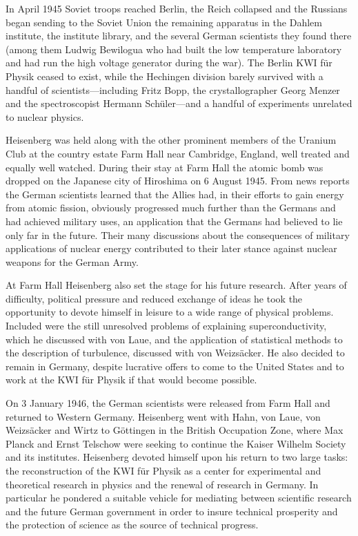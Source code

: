 \documentclass{article}
\begin{document}
In April 1945 Soviet troops reached Berlin, the Reich collapsed and the Russians began sending to the Soviet Union the remaining apparatus in the Dahlem institute, the institute library, and the several German scientists they found there (among them Ludwig Bewilogua who had built the low temperature laboratory and had run the high voltage generator during the war). The Berlin KWI für Physik ceased to exist, while the Hechingen division barely survived with a handful of scientists---including Fritz Bopp, the crystallographer Georg Menzer and the spectroscopist Hermann Schüler---and a handful of experiments unrelated to nuclear physics.

Heisenberg was held along with the other prominent members of the Uranium Club at the country estate Farm Hall near Cambridge, England, well treated and equally well watched. During their stay at Farm Hall the atomic bomb was dropped on the Japanese city of Hiroshima on 6 August 1945. From news reports the German scientists learned that the Allies had, in their efforts to gain energy from atomic fission, obviously progressed much further than the Germans and had achieved military uses, an application that the Germans had believed to lie only far in the future. Their many discussions about the consequences of military applications of nuclear energy contributed to their later stance against nuclear weapons for the German Army.

At Farm Hall Heisenberg also set the stage for his future research. After years of difficulty, political pressure and reduced exchange of ideas he took the opportunity to devote himself in leisure to a wide range of physical problems. Included were the still unresolved problems of explaining superconductivity, which he discussed with von Laue, and the application of statistical methods to the description of turbulence, discussed with von Weizsäcker. He also decided to remain in Germany, despite lucrative offers to come to the United States and to work at the KWI für Physik if that would become possible.

On 3 January 1946, the German scientists were released from Farm Hall and returned to Western Germany. Heisenberg went with Hahn, von Laue, von Weizsäcker and Wirtz to Göttingen in the British Occupation Zone, where Max Planck and Ernst Telschow were seeking to continue the Kaiser Wilhelm Society and its institutes. Heisenberg devoted himself upon his return to two large tasks: the reconstruction of the KWI für Physik as a center for experimental and theoretical research in physics and the renewal of research in Germany. In particular he pondered a suitable vehicle for mediating between scientific research and the future German government in order to insure technical prosperity and the protection of science as the source of technical progress.
\end{document}
